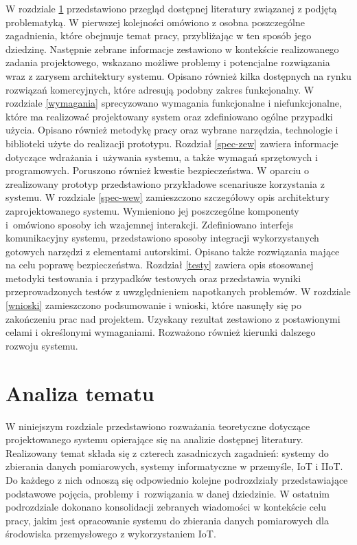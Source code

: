 \documentclass[a4paper, 12pt, twoside]{article}
\begin{document}
W rozdziale \ref{analiza} przedstawiono przegląd dostępnej literatury związanej z podjętą problematyką.
W pierwszej kolejności omówiono z osobna poszczególne zagadnienia, które
obejmuje temat pracy, przybliżając w ten sposób jego dziedzinę.
Następnie zebrane informacje zestawiono w kontekście realizowanego zadania projektowego,
wskazano możliwe problemy i potencjalne rozwiązania wraz z zarysem architektury
systemu. Opisano również kilka dostępnych na rynku rozwiązań komercyjnych,
które adresują podobny zakres funkcjonalny. W rozdziale \ref{wymagania} sprecyzowano
wymagania funkcjonalne i niefunkcjonalne, które ma realizować projektowany system
oraz zdefiniowano ogólne przypadki użycia.
Opisano również metodykę pracy oraz wybrane narzędzia, technologie i biblioteki użyte do realizacji
prototypu. Rozdział \ref{spec-zew} zawiera informacje dotyczące
wdrażania i~używania systemu, a także wymagań sprzętowych i programowych.
Poruszono również kwestie bezpieczeństwa. W oparciu o zrealizowany prototyp przedstawiono
przykładowe scenariusze korzystania z systemu. W rozdziale \ref{spec-wew} zamieszczono
szczegółowy opis architektury zaprojektowanego systemu. Wymieniono jej poszczególne
komponenty i~omówiono sposoby ich wzajemnej interakcji. Zdefiniowano interfejs
komunikacyjny systemu, przedstawiono sposoby integracji wykorzystanych gotowych
narzędzi z elementami autorskimi. Opisano także rozwiązania
mające na celu poprawę bezpieczeństwa. Rozdział \ref{testy} zawiera
opis stosowanej metodyki testowania i przypadków testowych oraz przedstawia wyniki przeprowadzonych
testów z uwzględnieniem napotkanych problemów. W rozdziale \ref{wnioski} zamieszczono
podsumowanie i wnioski, które nasunęły się po zakończeniu prac nad projektem.
Uzyskany rezultat zestawiono z postawionymi celami i określonymi wymaganiami.
Rozważono również kierunki dalszego rozwoju systemu.


\section{Analiza tematu}\label{analiza}

W niniejszym rozdziale przedstawiono rozważania teoretyczne dotyczące projektowanego
systemu opierające się na analizie dostępnej literatury. Realizowany temat
składa się z czterech zasadniczych zagadnień: systemy do zbierania danych pomiarowych,
systemy informatyczne w przemyśle, IoT i IIoT.  Do każdego z nich odnoszą się
odpowiednio kolejne podrozdziały przedstawiające podstawowe pojęcia, problemy i~rozwiązania
w danej dziedzinie.
W ostatnim podrozdziale dokonano konsolidacji zebranych wiadomości w kontekście
celu pracy, jakim jest opracowanie systemu do zbierania danych pomiarowych
dla środowiska przemysłowego z wykorzystaniem IoT.
\end{document}
